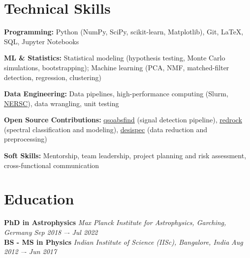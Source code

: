 \documentclass[a4paper,10pt]{article}
\begin{document}
\section*{Technical Skills}

\textcolor{sectionblue}{\textbf{Programming:}} 
Python (NumPy, SciPy, scikit-learn, Matplotlib), Git, LaTeX, SQL, Jupyter Notebooks

\textcolor{sectionblue}{\textbf{ML \& Statistics:}} 
Statistical modeling (hypothesis testing, Monte Carlo simulations, bootstrapping); 
Machine learning (PCA, NMF, matched-filter detection, regression, clustering)

\textcolor{sectionblue}{\textbf{Data Engineering:}} 
Data pipelines, high-performance computing (Slurm, \href{https://www.nersc.gov}{NERSC}), data wrangling, unit testing

\textcolor{sectionblue}{\textbf{Open Source Contributions:}} 
\href{https://github.com/abhi0395/qsoabsfind}{qsoabsfind} (signal detection pipeline), 
\href{https://github.com/desihub/redrock}{redrock} (spectral classification and modeling), 
\href{https://github.com/desihub/desispec}{desispec} (data reduction and preprocessing)

\textcolor{sectionblue}{\textbf{Soft Skills:}} 
Mentorship, team leadership, project planning and risk assessment, cross-functional communication


\vspace*{-2mm}

\section*{Education}

\textcolor{sectionblue}{\textbf{PhD in Astrophysics}} \hfill \textit{Max Planck Institute for Astrophysics, Garching, Germany} \hfill \textit{Sep 2018 –- Jul 2022}\\
\textcolor{sectionblue}{\textbf{BS - MS in Physics}} \hfill \textit{Indian Institute of Science (IISc), Bangalore, India} \hfill \textit{Aug 2012 –- Jun 2017}
\end{document}

